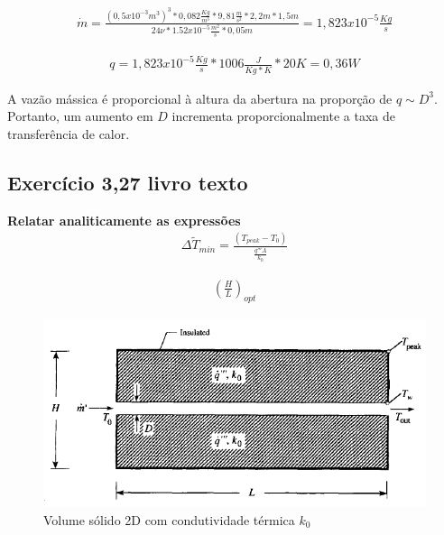 \documentclass[12pt]{article}
\begin{document}
\begin{equation}
	\begin{aligned}
		\dot{m} = \frac{{(0,5 x 10^{-3}m^{3})^3} * 0,082 \frac{Kg}{m^{3}}   *  9,81 \frac{m}{s^{2}}  *  2,2m  *  1,5 m  }{24\nu  *  1.52x 10^{-5}\frac{m^{2}}{s}  *   0,05 m} = 1,823 x 10 ^{-5} \frac{Kg}{s}
	\end{aligned}
\end{equation}

\begin{equation}
	\begin{aligned}
		q = 1,823 x 10 ^{-5} \frac{Kg}{s} * 1006 \frac{J}{Kg*K} * 20K = 0,36 W
	\end{aligned}
\end{equation}

A vazão mássica é proporcional à altura da abertura na proporção de $q \sim D^{3}$. Portanto, um aumento em $D$ incrementa proporcionalmente a taxa de transferência de calor. 

\subsection*{Exercício 3,27	 livro texto}
\textbf{Relatar analiticamente as expressões}\\

\begin{equation}
	\begin{aligned}
		\Delta \widetilde{T}_{min} = \frac{(T_{peak} - T_{0})}{\frac{q''' A}{k_{0}}}
	\end{aligned}
\end{equation}

\begin{equation}
	\begin{aligned}
		\left( \frac{H}{L}\right) _{opt}
	\end{aligned}
\end{equation}

\begin{figure}[H]
	\centering
	\includegraphics[width=.65\textwidth]{Figures/1_2}
	\caption{Volume sólido 2D com condutividade térmica $k_{0}$}
\end{figure}
\end{document}
